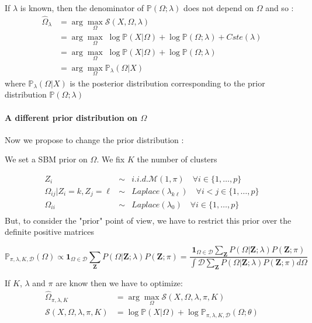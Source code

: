 \documentclass[10pt]{article}
\begin{document}
If $\lambda$ is known, then  the denominator of $\mathbb{P}(\Omega;\lambda)$ does not depend on $\Omega$ and so : 
\begin{align*}
\widehat \Omega_\lambda  &= \arg \max_{\Omega} \mathcal{S}(X,\Omega,\lambda) \\
  &= \arg \max_{\Omega} \;   \log \mathbb{P}(X | \Omega) +  \log \mathbb{P}(\Omega;\lambda)  + Cste(\lambda)\\
&= \arg \max_{\Omega}  \;  \log \mathbb{P}(X | \Omega) + \log   \mathbb{P}(\Omega;\lambda) \\
&=  \arg \max_{\Omega}   \mathbb{P}_\lambda(\Omega | X)
\end{align*}
where $ \mathbb{P}_\lambda(\Omega | X)$ is the posterior distribution corresponding to the prior distribution  $ \mathbb{P}(\Omega;\lambda) $


 




\paragraph{A different prior distribution on $\Omega$}

Now we propose to change the prior distribution : 


We set a SBM prior on $\Omega$. We fix $K$ the number of clusters

\begin{eqnarray*}
 Z_i &\sim& {i.i.d.} \mathcal{M}(1,\pi)  \quad  \forall i \in \{1, \dots, p\} \\
 \Omega_{ij} | Z_i=k,Z_j=\ell &\sim& Laplace(\lambda_{k\ell})  \quad  \forall i<j \in \{1, \dots, p\}\\
 \Omega_{ii} &\sim& Laplace(\lambda_0)  \quad  \forall i  \in \{1, \dots, p\}\\
\end{eqnarray*}
But, to consider the "prior" point of view, we have to restrict this prior  over the definite positive matrices

$$ \mathbb{P}_{\pi,\lambda,K, \mathcal{D}}(\Omega)\propto  \mathbf{1}_{\Omega\in  \mathcal{D}}  \sum_{\mathbf{Z}} P(\Omega |\mathbf{Z}; \lambda) P(\mathbf{Z}; \pi)  = \frac{\mathbf{1}_{\Omega\in  \mathcal{D}}  \sum_{\mathbf{Z}}P(\Omega |\mathbf{Z}; \lambda) P(\mathbf{Z}; \pi) }{ \int{\mathcal{D}}   \sum_{\mathbf{Z}} P(\Omega |\mathbf{Z}; \lambda) P(\mathbf{Z}; \pi)   d\Omega} $$


If $K$,  $\lambda$ and $\pi$ are know then we have to optimize: 
\begin{align*}
\widehat \Omega_{\pi,\lambda,K}  &= \arg \max_{\Omega} \mathcal{S}(X,\Omega, \lambda,\pi,K) \\
\mathcal{S}(X,\Omega, \lambda,\pi,K) &=  \log \mathbb{P}(X | \Omega) +  \log \mathbb{P}_{ \pi,\lambda,K, \mathcal{D} }(\Omega; \theta)    
\end{align*}
\end{document}
